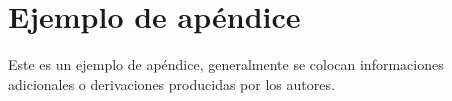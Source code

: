 \documentclass[12pt, a4paper, twoside, onecolumn]{article}
\begin{document}

%
%

\appendix
\section{Ejemplo de apéndice}

Este es un ejemplo de apéndice, generalmente se colocan informaciones adicionales o derivaciones producidas por los autores.


%
%
\end{document}
